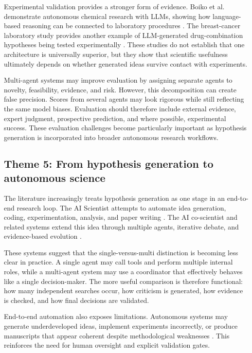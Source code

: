 \documentclass[11pt]{article}
\begin{document}
Experimental validation provides a stronger form of evidence. Boiko et al. demonstrate autonomous
chemical research with LLMs, showing how language-based reasoning can be connected to
laboratory procedures \cite{boiko2023autonomous}. The breast-cancer laboratory study provides
another example of LLM-generated drug-combination hypotheses being tested experimentally
\cite{scientific2025laboratory}. These studies do not establish that one architecture is universally
superior, but they show that scientific usefulness ultimately depends on whether generated ideas
survive contact with experiments.

Multi-agent systems may improve evaluation by assigning separate agents to novelty, feasibility,
evidence, and risk. However, this decomposition can create false precision. Scores from several
agents may look rigorous while still reflecting the same model biases. Evaluation should therefore include external evidence, expert judgment, prospective prediction, and where possible, experimental success.
These evaluation challenges become particularly important as hypothesis generation is incorporated into broader autonomous research workflows.

\subsection{Theme 5: From hypothesis generation to autonomous science}

The literature increasingly treats hypothesis generation as one stage in an end-to-end research loop.
The AI Scientist attempts to automate idea generation, coding, experimentation, analysis, and paper
writing \cite{lu2024ai}. The AI co-scientist and related systems extend this idea through multiple
agents, iterative debate, and evidence-based evolution \cite{gottweis2025towards}.

These systems suggest that the single-versus-multi distinction is becoming less clear in practice. A
single agent may call tools and perform multiple internal roles, while a multi-agent system may use
a coordinator that effectively behaves like a single decision-maker. The more useful comparison is
therefore functional: how many independent searches occur, how criticism is generated, how
evidence is checked, and how final decisions are validated.

End-to-end automation also exposes limitations. Autonomous systems may generate
underdeveloped ideas, implement experiments incorrectly, or produce manuscripts that appear
coherent despite methodological weaknesses \cite{lu2024ai,yamada2026towards}. This reinforces
the need for human oversight and explicit validation gates.
\end{document}
